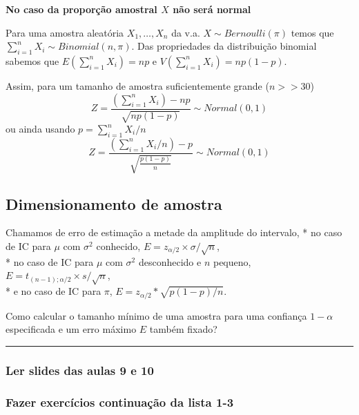 \documentclass[
]{article}
\begin{document}
\textbf{No caso da proporção amostral \(X\) não será normal}

Para uma amostra aleatória \(X_1, \ldots, X_n\) da v.a.
\(X \sim Bernoulli(\pi)\) temos que
\(\sum_{i=1}^n X_i \sim Binomial(n, \pi)\). Das propriedades da
distribuição binomial sabemos que \(E(\sum_{i=1}^n X_i) = np\) e
\(V(\sum_{i=1}^n X_i) = np(1-p)\).

Assim, para um tamanho de amostra suficientemente grande (\(n >> 30\))
\[Z =  \frac{(\sum_{i=1}^n X_i) - np}{\sqrt{np(1-p)}} \sim Normal(0,1)\]
ou ainda usando \(p = \sum_{i=1}^n X_i / n\)
\[Z =  \frac{(\sum_{i=1}^n X_i/n) - p}{\sqrt{\frac{p(1-p)}{n}}} \sim Normal(0,1)\]

\vspace{0.5cm}

\hypertarget{dimensionamento-de-amostra}{%
\subsection{Dimensionamento de
amostra}\label{dimensionamento-de-amostra}}

Chamamos de erro de estimação a metade da amplitude do intervalo, * no
caso de IC para \(\mu\) com \(\sigma^2\) conhecido,
\(E = z_{\alpha/2} \times \sigma / \sqrt{n}\),\\
* no caso de IC para \(\mu\) com \(\sigma^2\) desconhecido e \(n\)
pequeno, \(E = t_{(n-1); \alpha/2} \times s / \sqrt{n}\),\\
* e no caso de IC para \(\pi\), \(E = z_{\alpha/2} * \sqrt{p(1-p)/n}\).

Como calcular o tamanho mínimo de uma amostra para uma confiança
\(1-\alpha\) especificada e um erro máximo \(E\) também fixado?

\vspace{0.5cm}

\begin{center}\rule{0.5\linewidth}{0.5pt}\end{center}

\hypertarget{ler-slides-das-aulas-9-e-10}{%
\subsubsection{Ler slides das aulas 9 e
10}\label{ler-slides-das-aulas-9-e-10}}

\hypertarget{fazer-exercuxedcios-continuauxe7uxe3o-da-lista-1-3}{%
\subsubsection{Fazer exercícios continuação da lista
1-3}\label{fazer-exercuxedcios-continuauxe7uxe3o-da-lista-1-3}}
\end{document}
